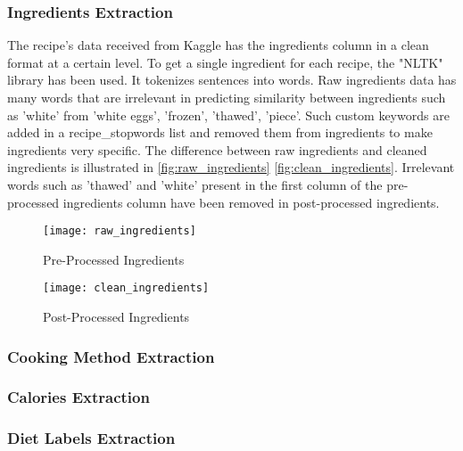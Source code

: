 \subsubsection{Ingredients Extraction}
The recipe's data received from Kaggle has the ingredients column in a clean format at a certain level. To get a single ingredient for each recipe, the "NLTK" library has been used. It tokenizes sentences into words. Raw ingredients data has many words that are irrelevant in predicting similarity between ingredients such as 'white' from 'white eggs', 'frozen', 'thawed', 'piece'. Such custom keywords are added in a recipe\_stopwords list and removed them from ingredients to make ingredients very specific. The difference between raw ingredients and cleaned ingredients is illustrated in \autoref{fig:raw_ingredients} \autoref{fig:clean_ingredients}. Irrelevant words such as 'thawed' and 'white' present in the first column of the pre-processed ingredients column have been removed in post-processed ingredients.

\begin{figure}[H]
	\centering
	\texttt{[image: raw\_ingredients]}
	\caption{Pre-Processed Ingredients }
	\label{fig:raw_ingredients}
\end{figure}  


\begin{figure}[H]
	\centering
	\texttt{[image: clean\_ingredients]}
	\caption{Post-Processed Ingredients }
	\label{fig:clean_ingredients}
\end{figure}  

\subsubsection{Cooking Method Extraction}
\subsubsection{Calories Extraction}
\subsubsection{Diet Labels Extraction}